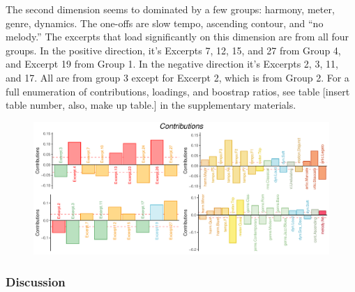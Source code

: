 \documentclass[
  english,
  man,floatsintext]{apa6}
\begin{document}
The second dimension seems to dominated by a few groups: harmony, meter, genre, dynamics. The one-offs are slow tempo, ascending contour, and ``no melody.'' The excerpts that load significantly on this dimension are from all four groups. In the positive direction, it's Excerpts 7, 12, 15, and 27 from Group 4, and Excerpt 19 from Group 1. In the negative direction it's Excerpts 2, 3, 11, and 17. All are from group 3 except for Excerpt 2, which is from Group 2. For a full enumeration of contributions, loadings, and boostrap ratios, see table {[}insert table number, also, make up table.{]} in the supplementary materials.

\begin{figure}

{\centering \includegraphics{Music-Descriptor-Space_files/figure-latex/contributionsQ-1} 

}

\caption{ }\label{fig:contributionsQ}
\end{figure}

\hypertarget{discussion}{%
\subsubsection{Discussion}\label{discussion}}
\end{document}
